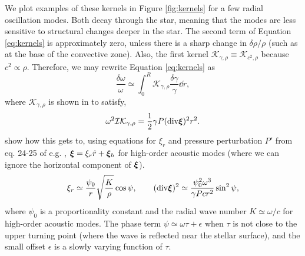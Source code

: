 We plot examples of these kernels in Figure \ref{fig:kernels} for a few radial oscillation modes. Both decay through the star, meaning that the modes are less sensitive to structural changes deeper in the star. The second term of Equation \ref{eq:kernels} is approximately zero, unless there is a sharp change in \(\delta\rho/\rho\) (such as at the base of the convective zone). Also, the first kernel \(\mathcal{K}_{\gamma,\rho} \equiv \mathcal{K}_{c^2,\rho}\) because \(c^2 \propto \rho\). Therefore, we may rewrite Equation \ref{eq:kernels} as
%
\begin{equation}
    \frac{\delta\omega}{\omega} \simeq \int_0^R \mathcal{K}_{\gamma,\rho} \frac{\delta\gamma}{\gamma} \dd r,\label{eq:delta-omega}
\end{equation}
%
where \(\mathcal{K}_{\gamma,\rho}\) is shown in \citet{Gough1993} to satisfy,
%
\begin{equation}
    \omega^2 \mathcal{I}\mathcal{K}_{\gamma,\rho} = \frac12 \gamma P (\mathrm{div} \bm{\xi})^2 r^2.\label{eq:gamma-kernel}
\end{equation}
%
\todo{} show how this gets to, using equations for \(\xi_r\) and pressure perturbation \(P'\) from eq. 24-25 of e.g. \citet{Shibahashi1979}, \(\bm{\xi} = \xi_r \hat{r} + \bm{\xi}_h\) for high-order acoustic modes (where we can ignore the horizontal component of \(\bm{\xi}\)).
%
\begin{equation}
    \xi_r \simeq \frac{\psi_0}{r}\sqrt{\frac{K}{\rho}} \cos\psi,\qquad
    (\mathrm{div} \bm{\xi})^2 \simeq \frac{\psi_0^2 \omega^3}{\gamma P c r^2} \sin^2\psi, \label{eq:xi-approx}
\end{equation}
%
where \(\psi_0\) is a proportionality constant and the radial wave number \(K \simeq \omega / c\) for high-order acoustic modes. The phase term \(\psi \simeq \omega \tau + \epsilon\) when \(\tau\) is not close to the upper turning point (where the wave is reflected near the stellar surface), and the small offset \(\epsilon\) is a slowly varying function of \(\tau\).

